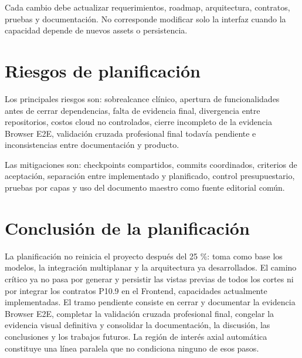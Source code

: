 Cada cambio debe actualizar requerimientos, roadmap, arquitectura, contratos, pruebas y documentación. No corresponde modificar solo la interfaz cuando la capacidad depende de nuevos assets o persistencia.

\section{Riesgos de planificación}

Los principales riesgos son: sobrealcance clínico, apertura de funcionalidades antes de cerrar dependencias, falta de evidencia final, divergencia entre repositorios, costos cloud no controlados, cierre incompleto de la evidencia Browser E2E, validación cruzada profesional final todavía pendiente e inconsistencias entre documentación y producto.

Las mitigaciones son: checkpoints compartidos, commits coordinados, criterios de aceptación, separación entre implementado y planificado, control presupuestario, pruebas por capas y uso del documento maestro como fuente editorial común.

\section{Conclusión de la planificación}

La planificación no reinicia el proyecto después del 25 \%: toma como base los modelos, la integración multiplanar y la arquitectura ya desarrollados. El camino crítico ya no pasa por generar y persistir las vistas previas de todos los cortes ni por integrar los contratos P10.9 en el Frontend, capacidades actualmente implementadas. El tramo pendiente consiste en cerrar y documentar la evidencia Browser E2E, completar la validación cruzada profesional final, congelar la evidencia visual definitiva y consolidar la documentación, la discusión, las conclusiones y los trabajos futuros. La región de interés axial automática constituye una línea paralela que no condiciona ninguno de esos pasos.
